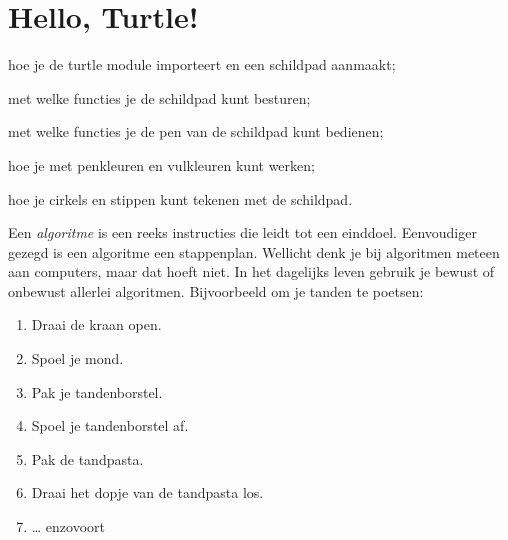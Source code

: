 \documentclass[../main]{subfiles}
\begin{document}
\graphicspath{{images/}}
\pagestyle{mypagestyle}

\chapter{Hello, Turtle!}
\label{chap:hello-turtle}

\begin{objectivesbox}
    \begin{objectiveslist}
        \item hoe je de turtle module importeert en een schildpad aanmaakt;
        \item met welke functies je de schildpad kunt besturen;
        \item met welke functies je de pen van de schildpad kunt bedienen;
        \item hoe je met penkleuren en vulkleuren kunt werken;
        \item hoe je cirkels en stippen kunt tekenen met de schildpad.
    \end{objectiveslist}
\end{objectivesbox}

Een \emph{algoritme} is een reeks instructies die leidt tot een einddoel. Eenvoudiger gezegd is een algoritme een stappenplan. Wellicht denk je bij algoritmen meteen aan computers, maar dat hoeft niet. In het dagelijks leven gebruik je bewust of onbewust allerlei algoritmen. Bijvoorbeeld om je tanden te poetsen:
\begin{minipage}[t]{0.6\linewidth}
\begin{enumerate}[itemsep=0pt, parsep=2pt]
\item Draai de kraan open.
\item Spoel je mond.
\item Pak je tandenborstel.
\item Spoel je tandenborstel af.
\item Pak de tandpasta.
\item Draai het dopje van de tandpasta los.
\item … enzovoort
\end{enumerate}
\end{minipage}\hfill
\begin{minipage}[t]{0.3\linewidth}
\end{minipage}
\end{document}
